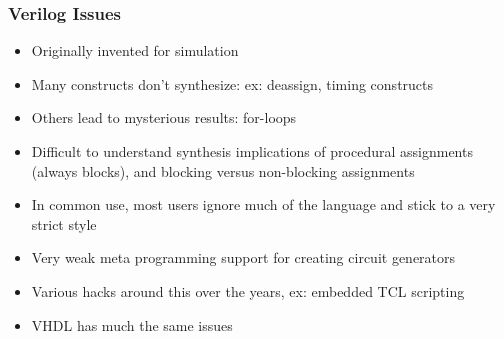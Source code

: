 \documentclass[xcolor=pdflatex,dvipsnames,table]{beamer}
\begin{document}
\begin{frame}

\frametitle{Verilog Issues}
\begin{itemize}
\item Originally invented for simulation
\item Many constructs don't synthesize: ex: deassign, timing constructs
\item Others lead to mysterious results: for-loops
\item Difficult to understand synthesis implications of procedural assignments (always blocks), and blocking versus non-blocking assignments
\item In common use, most users ignore much of the language and stick to a very strict style
\item Very weak meta programming support for creating circuit generators
\item Various hacks around this over the years, ex: embedded TCL scripting
\item VHDL has much the same issues
\end{itemize}

\end{frame}
\end{document}
